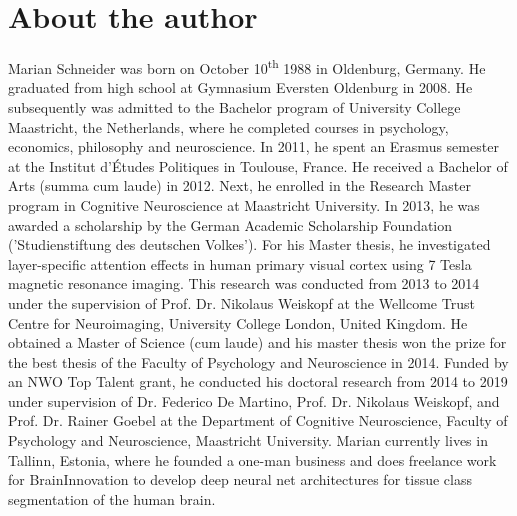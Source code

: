 \chapter{About the author}
Marian Schneider was born on October 10\textsuperscript{th} 1988 in Oldenburg, Germany. He graduated from high school at Gymnasium Eversten Oldenburg in 2008. He subsequently was admitted to the Bachelor program of University College Maastricht, the Netherlands, where he completed courses in psychology, economics, philosophy and neuroscience. In 2011, he spent an Erasmus semester at the Institut d'\'Etudes Politiques in Toulouse, France. He received a Bachelor of Arts (summa cum laude) in 2012. Next, he enrolled in the Research Master program in Cognitive Neuroscience at Maastricht University. In 2013, he was awarded a scholarship by the German Academic Scholarship Foundation ('Studienstiftung des deutschen Volkes'). For his Master thesis, he investigated layer-specific attention effects in human primary visual cortex using 7 Tesla magnetic resonance imaging. This research was conducted from 2013 to 2014 under the supervision of Prof. Dr. Nikolaus Weiskopf at the Wellcome Trust Centre for Neuroimaging, University College London, United Kingdom. He obtained a Master of Science (cum laude) and his master thesis won the prize for the best thesis of the Faculty of Psychology and Neuroscience in 2014. Funded by an NWO Top Talent grant, he conducted his doctoral research from 2014 to 2019 under supervision of Dr. Federico De Martino, Prof. Dr. Nikolaus Weiskopf, and Prof. Dr. Rainer Goebel at the Department of Cognitive Neuroscience, Faculty of Psychology and Neuroscience, Maastricht University. Marian currently lives in Tallinn, Estonia, where he founded a one-man business and does freelance work for BrainInnovation to develop deep neural net architectures for tissue class segmentation of the human brain.